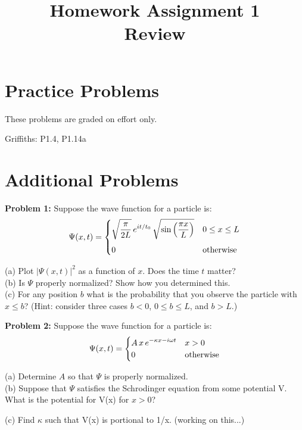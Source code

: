 \documentclass[12pt]{article}
\begin{document}

\date{\vspace{-5ex}}

\title{Homework Assignment 1 \\ Review}

\maketitle

\section*{Practice Problems}

These problems are graded on effort only.

Griffiths: P1.4, P1.14a

\section*{Additional Problems}

\vskip 1cm
\noindent
{\bf Problem 1:} Suppose the wave function for a particle is:
\begin{displaymath}
  \Psi(x,t) =
  \begin{cases}    
    {\displaystyle \sqrt{\frac{\pi}{2L}}\, e^{it/t_0} \, \sqrt{\sin\left(\frac{\pi x}{L}\right)}} & {\displaystyle 0 \leq x \leq L} \\[10pt]
    {\displaystyle 0} & {\displaystyle {\rm otherwise}} \\
  \end{cases}
\end{displaymath}

\noindent
(a) Plot $|\Psi(x,t)|^2$ as a function of $x$.  Does the time $t$ matter? \\[5pt]

\noindent
(b) Is $\Psi$ properly normalized?  Show how you determined this.\\[5pt]

\noindent
(c) For any position $b$ what is the probability that you observe the particle with $x \leq b$?  (Hint: consider three cases $b<0$, $0 \leq b \leq L$, and $b > L$.)

\vskip 1cm
\noindent
{\bf Problem 2:} Suppose the wave function for a particle is:
\begin{displaymath}
  \Psi(x,t) =
  \begin{cases}    
    {\displaystyle A \, x \, e^{-\kappa x - i \omega t}} & {\displaystyle x > 0} \\
    {\displaystyle 0} & {\displaystyle {\rm otherwise}} \\
  \end{cases}
\end{displaymath}

\noindent
(a) Determine $A$ so that $\Psi$ is properly normalized. \\[5pt]

\noindent
(b) Suppose that $\Psi$ satisfies the Schrodinger equation from some potential V.  What is the potential for V(x) for $x > 0$?

(c) Find $\kappa$ such that V(x) is portional to 1/x. (working on this...)
\end{document}
